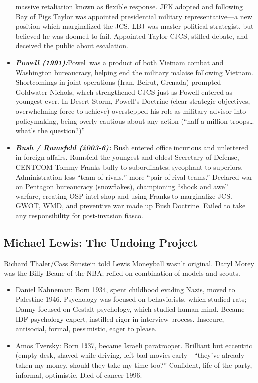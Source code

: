 \documentclass[
]{article}
\begin{document}
\begin{itemize}
  massive retaliation known as flexible response. JFK adopted and
  following Bay of Pigs Taylor was appointed presidential military
  representative---a new position which marginalized the JCS. LBJ was
  master political strategist, but believed he was doomed to fail.
  Appointed Taylor CJCS, stifled debate, and deceived the public about
  escalation.
\item
  \textbf{\emph{Powell (1991):}}Powell was a product of both Vietnam
  combat and Washington bureaucracy, helping end the military malaise
  following Vietnam. Shortcomings in joint operations (Iran, Beirut,
  Grenada) prompted Goldwater-Nichols, which strengthened CJCS just as
  Powell entered as youngest ever. In Desert Storm, Powell's Doctrine
  (clear strategic objectives, overwhelming force to achieve)
  overstepped his role as military advisor into policymaking, being
  overly cautious about any action (``half a million troops\ldots what's
  the question?)''
\item
  \textbf{\emph{Bush / Rumsfeld (2003-6):}} Bush entered office
  incurious and unlettered in foreign affairs. Rumsfeld the youngest and
  oldest Secretary of Defense, CENTCOM Tommy Franks bully to
  subordinates; sycophant to superiors. Administration less ``team of
  rivals,'' more ``pair of rival teams.'' Declared war on Pentagon
  bureaucracy (snowflakes), championing ``shock and awe'' warfare,
  creating OSP intel shop and using Franks to marginalize JCS. GWOT,
  WMD, and preventive war made up Bush Doctrine. Failed to take any
  responsibility for post-invasion fiasco.
\end{itemize}

\hypertarget{michael-lewis-the-undoing-project}{%
\subsection{Michael Lewis: The Undoing
Project}\label{michael-lewis-the-undoing-project}}

Richard Thaler/Cass Sunstein told Lewis Moneyball wasn't original. Daryl
Morey was the Billy Beane of the NBA; relied on combination of models
and scouts.

\begin{itemize}
\item
  Daniel Kahneman: Born 1934, spent childhood evading Nazis, moved to
  Palestine 1946. Psychology was focused on behaviorists, which studied
  rats; Danny focused on Gestalt psychology, which studied human mind.
  Became IDF psychology expert, instilled rigor in interview process.
  Insecure, antisocial, formal, pessimistic, eager to please.
\item
  Amos Tversky: Born 1937, became Israeli paratrooper. Brilliant but
  eccentric (empty desk, shaved while driving, left bad movies
  early---``they've already taken my money, should they take my time
  too?'' Confident, life of the party, informal, optimistic. Died of
  cancer 1996.
\end{itemize}
\end{document}
